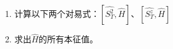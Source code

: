 \begin{enumerate}
\begin{enumerate}
	\item 
	计算以下两个对易式：\(\left[\hat{S_{T}^{2}}, \hat{H}\right]\)、\(\left[\hat{S_{T}^{z}}, \hat{H}\right]\)
	
	\item 
	求出\(\hat{H}\)的所有本征值。
\end{enumerate}

	
	\banswer{
		
	}
	
	
	
\end{enumerate}


